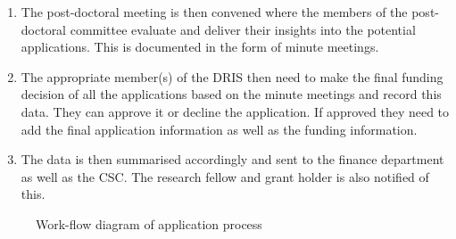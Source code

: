 \documentclass[12pt]{article}
\begin{document}
\begin{itemize}
\begin{enumerate}
			\item The post-doctoral meeting is then convened where the members of the post-doctoral committee evaluate and deliver their insights into the potential applications. This is documented in the form of minute meetings. 
			\item The appropriate member(s) of the DRIS then need to make the final funding decision of all the applications based on the minute meetings and record this data. They can approve it or decline the application. If approved they need to add the final application information as well as the funding information.
			\item The data is then summarised accordingly and sent to the finance department as well as the CSC. The research fellow and grant holder is also notified of this.    
		\end{enumerate}

	
\end{itemize}

\begin{figure}[H]
\centering	
{}
\caption{Work-flow diagram of application process}
\end{figure}
\end{document}
